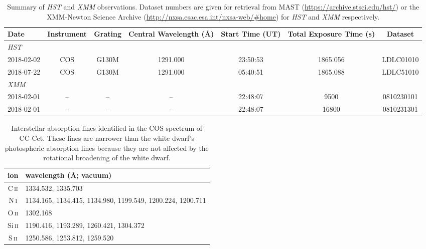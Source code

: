 \documentclass[fleqn,usenatbib]{mnras}
\newcommand{\Ion}[2]{#1{\,\textsc{#2}}}
\begin{document}
\begin{table}
\centering
\caption{Summary of \textit{HST} and \textit{XMM} observations. Dataset numbers are given for retrieval from MAST (\url{https://archive.stsci.edu/hst/}) or the XMM-Newton Science Archive (\url{http://nxsa.esac.esa.int/nxsa-web/\#home}) for \textit{HST} and \textit{XMM} respectively.}  
\begin{tabular}{lcccccc}\\
\hline
Date & Instrument & Grating &  Central Wavelength (\AA) & Start Time (UT) & Total Exposure Time (s) & Dataset \\
\hline 
\textit{HST} & & & & & & \\
2018-02-02 & COS &	G130M &	1291.000 & 23:50:53 & 	1865.056 &	LDLC01010 \\
2018-07-22 & 	COS &	G130M &	1291.000 	& 05:40:51 & 1865.088 &	LDLC51010\\
\textit{XMM} & & & & & & \\
2018-02-01 & -- & -- & -- & 22:48:07 & 9500 & 0810230101\\
2018-02-01 & -- & -- & -- & 22:48:07 & 16800 & 0810231301\\
	


\hline

\hline
\end{tabular}
\label{tab:hst_obs}
\end{table}

\begin{table}
    \centering
    \caption{Interstellar absorption lines identified in the COS spectrum of CC-Cet. These lines are narrower than the white dwarf's photospheric absorption lines because they are not affected by the rotational broadening of the white dwarf.}
    \label{tab:ISlines}
    \begin{tabular}{c l}
        \hline \hline
        ion & wavelength (\AA; vacuum) \\
        \hline
        \Ion{C}{ii}   & 1334.532, 1335.703\\
        \Ion{N}{i}    & 1134.165, 1134.415, 1134.980, 1199.549, 1200.224, 1200.711\\
        \Ion{O}{ii}   & 1302.168\\
        \Ion{Si}{ii}  & 1190.416, 1193.289, 1260.421, 1304.372\\
        \Ion{S}{ii}   & 1250.586, 1253.812, 1259.520\\
        \hline
    \end{tabular}
\end{table}
\end{document}
